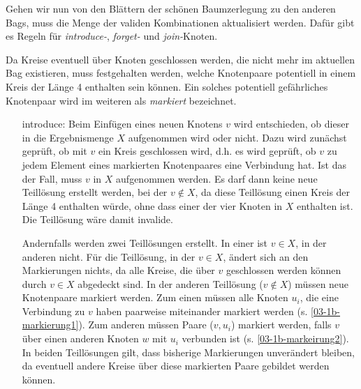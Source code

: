 Gehen wir nun von den Blättern der schönen Baumzerlegung zu den anderen Bags, muss die Menge der validen Kombinationen aktualisiert werden. Dafür gibt es Regeln für \textit{introduce-}, \textit{forget-} und \textit{join-}Knoten. 

Da Kreise eventuell über Knoten geschlossen werden, die nicht mehr im aktuellen Bag existieren, muss festgehalten werden, welche Knotenpaare potentiell in einem Kreis der Länge 4 enthalten sein können. Ein solches potentiell gefährliches Knotenpaar wird im weiteren als \textit{markiert} bezeichnet.

\begin{itemize}
\item[introduce: ]Beim Einfügen eines neuen Knotens $v$ wird entschieden, ob dieser in die Ergebnismenge $X$ aufgenommen wird oder nicht. Dazu wird zunächst geprüft, ob mit $v$ ein Kreis geschlossen wird, d.h. es wird geprüft, ob $v$ zu jedem Element eines markierten Knotenpaares eine Verbindung hat. Ist das der Fall, muss $v$ in $X$ aufgenommen werden. Es darf dann keine neue Teillösung erstellt werden, bei der $v\notin X$, da diese Teillösung einen Kreis der Länge 4 enthalten würde, ohne dass einer der vier Knoten in $X$ enthalten ist. Die Teillösung wäre damit invalide.

Andernfalls werden zwei Teillösungen erstellt. In einer ist $v\in X$, in der anderen nicht. Für die Teillösung, in der $v\in X$, ändert sich an den Markierungen nichts, da alle Kreise, die über $v$ geschlossen werden können durch $v\in X$ abgedeckt sind. In der anderen Teillösung ($v\notin X$) müssen neue Knotenpaare markiert werden. Zum einen müssen alle Knoten $u_i$, die eine Verbindung zu $v$ haben paarweise miteinander markiert werden (s. \autoref{03-1b-markierung1}). Zum anderen müssen Paare ($v,u_i$) markiert werden, falls $v$ über einen anderen Knoten $w$ mit $u_i$ verbunden ist (s. \autoref{03-1b-markeirung2}). In beiden Teillösungen gilt, dass bisherige Markierungen unverändert bleiben, da eventuell andere Kreise über diese markierten Paare gebildet werden können.


\end{itemize}
